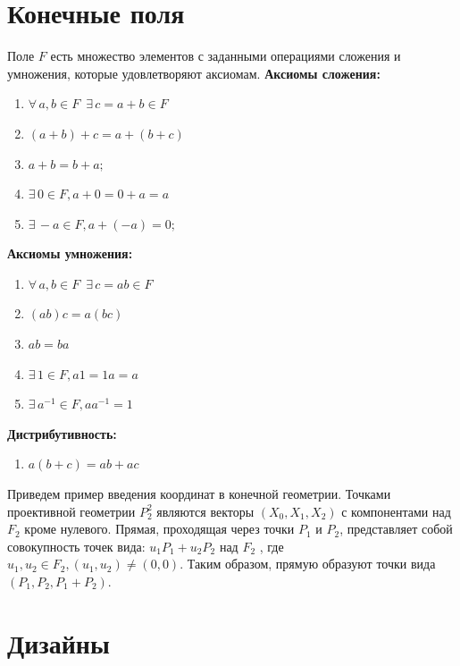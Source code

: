 \documentclass[12pt]{article}
\begin{document}
    \section{Конечные поля}
    Поле $F$ есть множество элементов с заданными операциями сложения и умножения, которые удовлетворяют аксиомам.\newline\newline
    \textbf{Аксиомы сложения:}
    \begin{enumerate}
        \item $\forall \, a, b \in F \,\,\, \exists \, c = a + b \in F$
        \item $(a + b) + c = a + (b + c)$
        \item $a + b = b + a;$
        \item $\exists \, 0 \in F, a + 0 = 0 + a = a$
        \item $\exists \, - a \in F, a + (-a) = 0;$\newline\newline\newline
    \end{enumerate}
    \textbf{Аксиомы умножения:}
    \begin{enumerate}
        \item $\forall \, a, b \in F \,\,\, \exists \, c = ab \in F$
        \item $(ab)c = a(bc)$
        \item $ab = ba$
        \item $\exists \, 1 \in F, a1 = 1a = a$
        \item $\exists \, a^{-1} \in F, aa^{-1} = 1$
    \end{enumerate}
    \textbf{Дистрибутивность:}
    \begin{enumerate}
        \item $a(b + c) = ab + ac$
    \end{enumerate}
    Приведем пример введения координат в конечной геометрии.
    Точками проективной геометрии $P^2_2$ являются векторы $(X_0, X_1, X_2)$
    с компонентами над $F_2$ кроме нулевого. Прямая, проходящая через
    точки $P_1$ и $P_2$, представляет собой совокупность точек вида: $u_1P_1+
    u_2P_2$ над $F_2$ , где $u_1, u_2 \in F_2, (u_1, u_2) \neq (0, 0)$. Таким образом, прямую образуют точки вида $(P_1, P_2, P_1 + P_2)$.


    \section{Дизайны}
\end{document}
